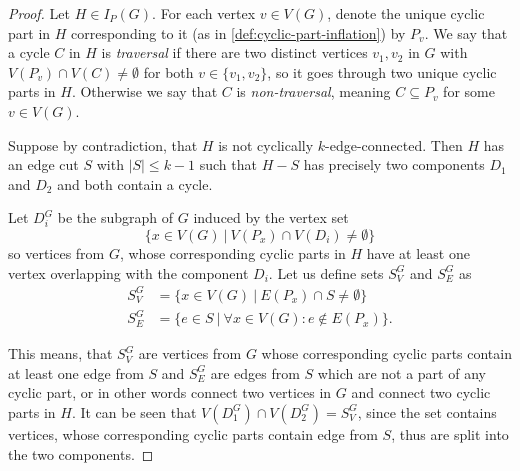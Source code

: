 \documentclass[12pt, twoside]{book}
\begin{document}
\begin{proof}
	Let $H\in I_P(G)$. For each vertex $v\in V(G)$, denote the unique cyclic part in $H$ corresponding to it (as in \cref{def:cyclic-part-inflation}) by $P_v$. We say that a cycle $C$ in $H$ is \textit{traversal} if there are two distinct vertices $v_1,v_2$ in $G$ with $V(P_v)\cap V(C)\neq \emptyset$ for both $v\in\{v_1,v_2\}$, so it goes through two unique cyclic parts in $H$. Otherwise we say that $C$ is \textit{non-traversal}, meaning $C\subseteq P_v$ for some $v\in V(G)$. 
	
	Suppose by contradiction, that $H$ is not cyclically $k$-edge-connected. Then $H$ has an edge cut $S$ with $|S|\leq k-1$ such that $H-S$ has precisely two components $D_1$ and $D_2$ and both contain a cycle.
	
	Let $D_i^G$ be the subgraph of $G$ induced by the vertex set $$\{x\in V(G)~|~ V(P_x)\cap V(D_i)\neq \emptyset\}$$
	so vertices from $G$, whose corresponding cyclic parts in $H$ have at least one vertex overlapping with the component $D_i$. Let us define sets $S_V^G$ and $S_E^G$ as
	\begin{align*}
		S_V^G &= \{x\in V(G) ~|~ E(P_x)\cap S\neq \emptyset\} \\
		S_E^G &= \{e\in S ~|~ \forall x\in V(G): e\notin E(P_x) \}.
	\end{align*}
	
	This means, that $S_V^G$ are vertices from $G$ whose corresponding cyclic parts contain at least one edge from $S$ and $S_E^G$ are edges from $S$ which are not a part of any cyclic part, or in other words connect two vertices in $G$ and connect two cyclic parts in $H$. It can be seen that ${V(D_1^G)\cap V(D_2^G)=S_V^G}$, since the set contains vertices, whose corresponding cyclic parts contain edge from $S$, thus are split into the two components.
	

\end{proof}
\end{document}
